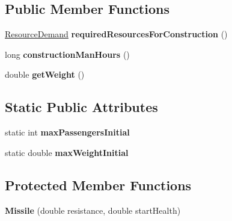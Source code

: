 \subsection*{Public Member Functions}
\begin{DoxyCompactItemize}
\item 
\hyperlink{classuniverse_1_1_resource_demand}{Resource\+Demand} {\bfseries required\+Resources\+For\+Construction} ()\hypertarget{classtools_1_1vehicles_1_1air_1_1_missile_a129022eb7688578402a5606ea9c2a5a0}{}\label{classtools_1_1vehicles_1_1air_1_1_missile_a129022eb7688578402a5606ea9c2a5a0}

\item 
long {\bfseries construction\+Man\+Hours} ()\hypertarget{classtools_1_1vehicles_1_1air_1_1_missile_a2c79f761b3f02d12e4ff94e9cd3ab021}{}\label{classtools_1_1vehicles_1_1air_1_1_missile_a2c79f761b3f02d12e4ff94e9cd3ab021}

\item 
double {\bfseries get\+Weight} ()\hypertarget{classtools_1_1vehicles_1_1air_1_1_missile_a856917a32d2e89aa376dc800e4ecaf48}{}\label{classtools_1_1vehicles_1_1air_1_1_missile_a856917a32d2e89aa376dc800e4ecaf48}

\end{DoxyCompactItemize}
\subsection*{Static Public Attributes}
\begin{DoxyCompactItemize}
\item 
static int {\bfseries max\+Passengers\+Initial}\hypertarget{classtools_1_1vehicles_1_1air_1_1_missile_a4510b76dcc3576571b6e121cc79ebb12}{}\label{classtools_1_1vehicles_1_1air_1_1_missile_a4510b76dcc3576571b6e121cc79ebb12}

\item 
static double {\bfseries max\+Weight\+Initial}\hypertarget{classtools_1_1vehicles_1_1air_1_1_missile_a80b8f304aef23acb6828d15d427b168f}{}\label{classtools_1_1vehicles_1_1air_1_1_missile_a80b8f304aef23acb6828d15d427b168f}

\end{DoxyCompactItemize}
\subsection*{Protected Member Functions}
\begin{DoxyCompactItemize}
\item 
{\bfseries Missile} (double resistance, double start\+Health)\hypertarget{classtools_1_1vehicles_1_1air_1_1_missile_a9b66fd690e2c215336142fac565b8d43}{}\label{classtools_1_1vehicles_1_1air_1_1_missile_a9b66fd690e2c215336142fac565b8d43}

\end{DoxyCompactItemize}
